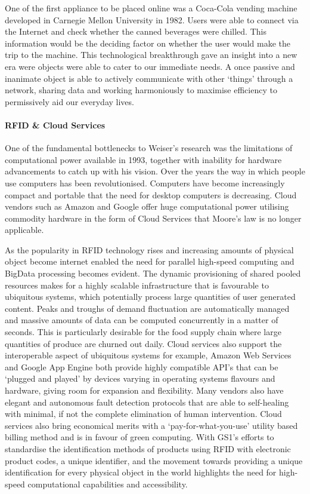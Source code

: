 \documentclass[a4paper, 11pt]{article}
\begin{document}
One of the first appliance to be placed online was a Coca-Cola vending machine developed in Carnegie Mellon University in 1982. Users were able to connect via the Internet and check whether the canned beverages were chilled. This information would be the deciding factor on whether the user would make the trip to the machine. This technological breakthrough gave an insight into a new era were objects were able to cater to our immediate needs. A once passive and inanimate object is able to actively communicate with other `things' through a network, sharing data and working harmoniously to maximise efficiency to permissively aid our everyday lives.

\paragraph{RFID \& Cloud Services}One of the fundamental bottlenecks to Weiser's research was the limitations of computational power available in 1993\cite{weiserLimit}, together with inability for hardware advancements to catch up with his vision. Over the years the way in which people use computers has been revolutionised. Computers have become increasingly compact and portable that the need for desktop computers is decreasing. Cloud vendors such as Amazon and Google offer huge computational power utilising commodity hardware in the form of Cloud Services that Moore's law is no longer applicable\cite{HadoopInAction}. 

As the popularity in RFID technology rises and increasing amounts of physical object become internet enabled the need for parallel high-speed computing and BigData processing becomes evident. The dynamic provisioning of shared pooled resources makes for a highly scalable infrastructure that is favourable to ubiquitous systems, which potentially process large quantities of user generated content. Peaks and troughs of demand fluctuation are automatically managed and massive amounts of data can be computed concurrently in a matter of seconds. This is particularly desirable for the food supply chain where large quantities of produce are churned out daily. Cloud services also support the interoperable aspect of ubiquitous systems for example, Amazon Web Services and Google App Engine both provide highly compatible API's that can be `plugged and played' by devices varying in operating systems flavours and hardware, giving room for expansion and flexibility. Many vendors also have elegant and autonomous fault detection protocols that are able to self-healing with minimal, if not the complete elimination of human intervention. Cloud services also bring economical merits with a `pay-for-what-you-use' utility based billing method and is in favour of green computing.\cite{CAYS} With GS1's efforts to standardise the identification methods of products using RFID with electronic product codes, a unique identifier, and the movement towards providing a unique identification for every physical object in the world highlights the need for high-speed computational capabilities and accessibility.\cite{GS1}
\end{document}
